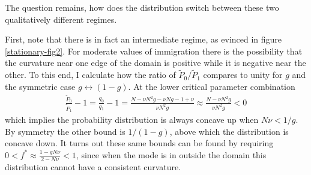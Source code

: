 The question remains, how does the distribution switch between these two qualitatively different regimes. 
\iffalse
To observe this I calculate the curvature of the extremum point. 
It goes from positive to negative as the immigration rate is increased, and there must be a critical value at which it changes sign. 
This is found when $\partial_n^2 q_n=0$. 
I note that $\partial_n^2 q_n=\partial_n \big(q_n \partial_n \ln[q_n] \big) = q_n \big( (\partial_n \ln[q_n])^2 + \partial_n^2 \ln[q_n] \big)$. 
$q_n>0$ and $\partial_n \ln[q_n]=0$ at the extremum so an equivalent problem is to find the parameter values that make $\partial_n^2 \ln[q_n]=0$ at the extremum. 
\begin{align*}
 \partial_n^2 \ln[q_n] &= \frac{\gamma}{f-1} + \frac{\gamma}{f-\gamma+\epsilon g} + \frac{\gamma}{\gamma-f} + \frac{\gamma}{1-f+\epsilon(1-g)} + \frac{2\gamma^2}{f\big(1-f+\epsilon(1-g)\big)} + \frac{\gamma^2\big(2f-1-\epsilon(1-g)\big)}{f\big(1-f+\epsilon(1-g)\big)^2} + \frac{\gamma^2\big(1-2f+\epsilon(1-g)\big)}{f^2\big(1-f+\epsilon(1-g)\big)}
\end{align*}
Substituting $f^*$ and expanding to lowest order makes the sign proportional to
\begin{equation*}
 4 - 2\epsilon/\gamma - \big(1-4g(1-g)\big)\big(\epsilon/\gamma\big)^2
\end{equation*}
\fi
First, note that there is in fact an intermediate regime, as evinced in figure \ref{stationary-fig2}. 
For moderate values of immigration there is the possibility that the curvature near one edge of the domain is positive while it is negative near the other. 
To this end, I calculate how the ratio of $\widetilde{P}_0/\widetilde{P}_1$ compares to unity for $g$ and the symmetric case $g\leftrightarrow (1-g)$. 
At the lower critical parameter combination
\begin{align*}
 \frac{\widetilde{P}_0}{\widetilde{P}_1} - 1 = \frac{q_0}{q_1} - 1 = \frac{N - \nu N^2 g - \nu N g - 1 + \nu}{\nu N^2 g} \approx \frac{N - \nu N^2 g}{\nu N^2 g} < 0
\end{align*}
which implies the probability distribution is always concave up when $N\nu < 1/g$. %
By symmetry the other bound is $1/(1-g)$, above which the distribution is concave down. 
It turns out these same bounds can be found by requiring $0<f^*\approx\frac{1-g N\nu}{2-N\nu}<1$, since when the mode is in outside the domain this distribution cannot have a consistent curvature. 

